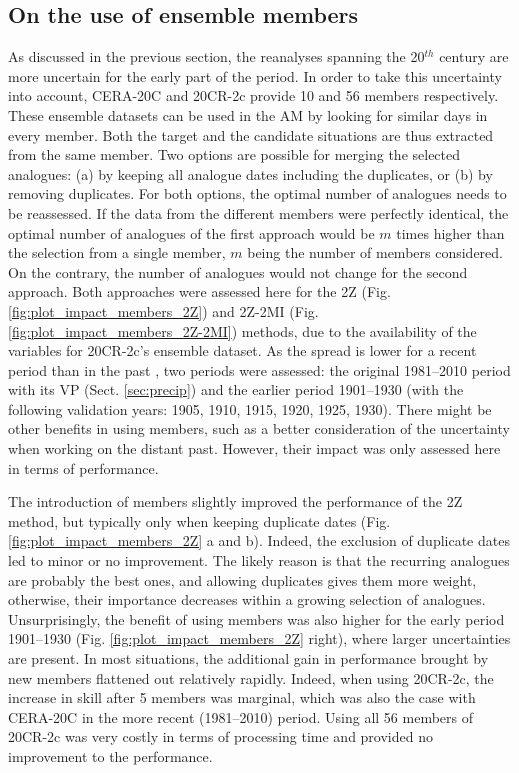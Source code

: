 \documentclass[smallextended]{svjour3}       %
\begin{document}
	
	\subsection{On the use of ensemble members}
	\label{sec:ensemble}
	
	As discussed in the previous section, the reanalyses spanning the 20$^{th}$ century are more uncertain for the early part of the period. In order to take this uncertainty into account, CERA-20C and 20CR-2c provide 10 and 56 members respectively. These ensemble datasets can be used in the AM by looking for similar days in every member. Both the target and the candidate situations are thus extracted from the same member. Two options are possible for merging the selected analogues: (a) by keeping all analogue dates including the duplicates, or (b) by removing duplicates. For both options, the optimal number of analogues needs to be reassessed. If the data from the different members were perfectly identical, the optimal number of analogues of the first approach would be $m$ times higher than the selection from a single member, $m$ being the number of members considered. On the contrary, the number of analogues would not change for the second approach. Both approaches were assessed here for the 2Z (Fig. \ref{fig:plot_impact_members_2Z}) and 2Z-2MI (Fig. \ref{fig:plot_impact_members_2Z-2MI}) methods, due to the availability of the variables for 20CR-2c's ensemble dataset. As the spread is lower for a recent period than in the past \citep{Compo2011}, two periods were assessed: the original 1981--2010 period with its VP (Sect. \ref{sec:precip}) and the earlier period 1901--1930 (with the following validation years: 1905, 1910, 1915, 1920, 1925, 1930). There might be other benefits in using members, such as a better consideration of the uncertainty when working on the distant past. However, their impact was only assessed here in terms of performance.
	
	The introduction of members slightly improved the performance of the 2Z method, but typically only when keeping duplicate dates (Fig. \ref{fig:plot_impact_members_2Z} a and b). Indeed, the exclusion of duplicate dates led to minor or no improvement. The likely reason is that the recurring analogues are probably the best ones, and allowing duplicates gives them more weight, otherwise, their importance decreases within a growing selection of analogues. Unsurprisingly, the benefit of using members was also higher for the early period 1901--1930 (Fig. \ref{fig:plot_impact_members_2Z} right), where larger uncertainties are present. In most situations, the additional gain in performance brought by new members flattened out relatively rapidly. Indeed, when using 20CR-2c, the increase in skill after 5 members was marginal, which was also the case with CERA-20C in the more recent (1981--2010) period. Using all 56 members of 20CR-2c was very costly in terms of processing time and provided no improvement to the performance. 
	
\end{document}
